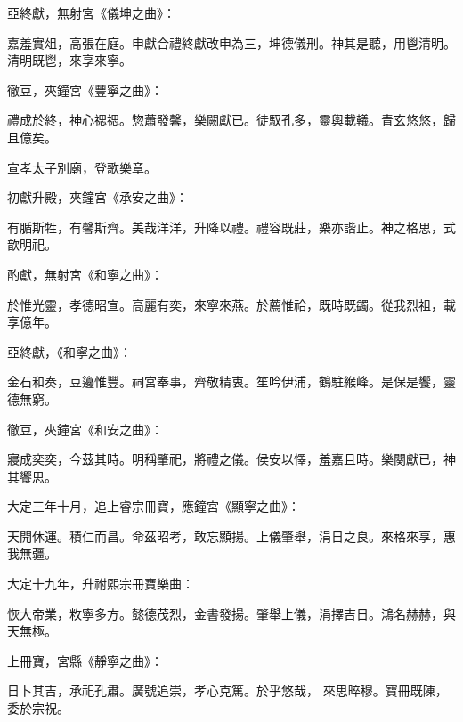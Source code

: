 \begin{pinyinscope}
 亞終獻，無射宮《儀坤之曲》：



 嘉羞實俎，高張在庭。申獻合禮終獻改申為三，坤德儀刑。神其是聽，用鬯清明。清明既鬯，來享來寧。



 徹豆，夾鐘宮《豐寧之曲》：



 禮成於終，神心禗禗。惣蕭發馨，樂闕獻已。徒馭孔多，靈輿載轙。青玄悠悠，歸且億矣。



 宣孝太子別廟，登歌樂章。



 初獻升殿，夾鐘宮《承安之曲》：



 有腯斯牲，有馨斯齊。美哉洋洋，升降以禮。禮容既莊，樂亦諧止。神之格思，式歆明祀。



 酌獻，無射宮《和寧之曲》：



 於惟光靈，孝德昭宣。高麗有奕，來寧來燕。於薦惟祫，既時既蠲。從我烈祖，載享億年。



 亞終獻，《和寧之曲》：



 金石和奏，豆籩惟豐。祠宮奉事，齊敬精衷。笙吟伊浦，鶴駐緱峰。是保是饗，靈德無窮。



 徹豆，夾鐘宮《和安之曲》：



 寢成奕奕，今茲其時。明稱肇祀，將禮之儀。侯安以懌，羞嘉且時。樂闋獻已，神其饗思。



 大定三年十月，追上睿宗冊寶，應鐘宮《顯寧之曲》：



 天開休運。積仁而昌。命茲昭考，敢忘顯揚。上儀肇舉，涓日之良。來格來享，惠我無疆。



 大定十九年，升祔熙宗冊寶樂曲：



 恢大帝業，敉寧多方。懿德茂烈，金書發揚。肇舉上儀，涓擇吉日。鴻名赫赫，與天無極。



 上冊寶，宮縣《靜寧之曲》：



 日卜其吉，承祀孔肅。廣號追崇，孝心克篤。於乎悠哉，
 來思晬穆。寶冊既陳，委於宗祝。




\end{pinyinscope}
